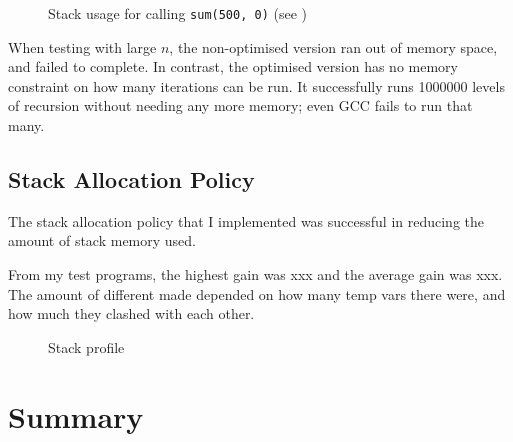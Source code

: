 \documentclass[00-main.tex]{subfiles}
\begin{document}
\begin{figure}[ht]
  \centering
  \caption{Stack usage for calling \texttt{sum(500, 0)} (see )}
  \label{fig:plot:tail-call optimisation stack use}
\end{figure}

When testing with large $n$, the non-optimised version ran out of memory space, and failed to complete.
In contrast, the optimised version has no memory constraint on how many iterations can be run.
It successfully runs \num{1000000} levels of recursion without needing any more memory; even GCC fails to run that many.


\subsection{Stack Allocation Policy}

The stack allocation policy that I implemented was successful in reducing the amount of stack memory used.

From my test programs, the highest gain was xxx and the average gain was xxx.
The amount of different made depended on how many temp vars there were, and how much they clashed with each other.

\begin{figure}[ht]
  \centering
  \caption{Stack profile}
  \label{fig:}
\end{figure}

\section{Summary}
\end{document}
